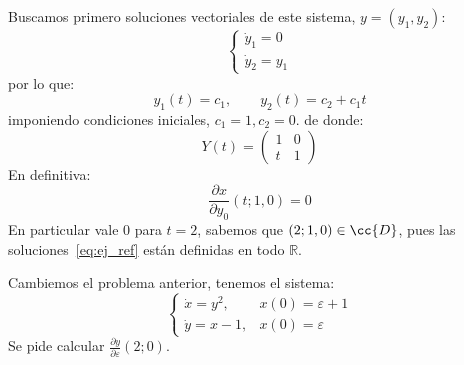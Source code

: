 \begin{ejercicio}
    Buscamos primero soluciones vectoriales de este sistema, $y = (y_1,y_2)$:
    \begin{equation*}
        \left\{\begin{array}{l}
                \dot{y}_1 = 0 \\
                \dot{y}_2 = y_1
        \end{array}\right.
    \end{equation*}
    por lo que:
    \begin{equation*}
        y_1(t) = c_1, \qquad y_2(t) = c_2 + c_1 t
    \end{equation*}
    imponiendo condiciones iniciales, $c_1 = 1, c_2 = 0$.
    de donde:
    \begin{equation*}
        Y(t) = \left(\begin{array}{cc}
            1 & 0 \\
            t & 1 
        \end{array}\right)
    \end{equation*}
    En definitiva:
    \begin{equation*}
        \frac{\partial x}{\partial y_0}(t;1,0) = 0
    \end{equation*}
    En particular vale 0 para $t=2$, sabemos que $(2;1,0)\in \cc{D}$, pues las soluciones~\eqref{eq:ej_ref} están definidas en todo $\mathbb{R}$.
\end{ejercicio}

\begin{ejercicio}
    Cambiemos el problema anterior, tenemos el sistema:
    \begin{equation*}
        \left\{\begin{array}{ll}
                \dot{x} = y^2, & x(0) = \varepsilon+1 \\
                \dot{y} = x-1, & x(0) = \varepsilon
        \end{array}\right.
    \end{equation*}
    Se pide calcular $\frac{\partial y}{\partial \varepsilon}(2;0)$.
\end{ejercicio}
